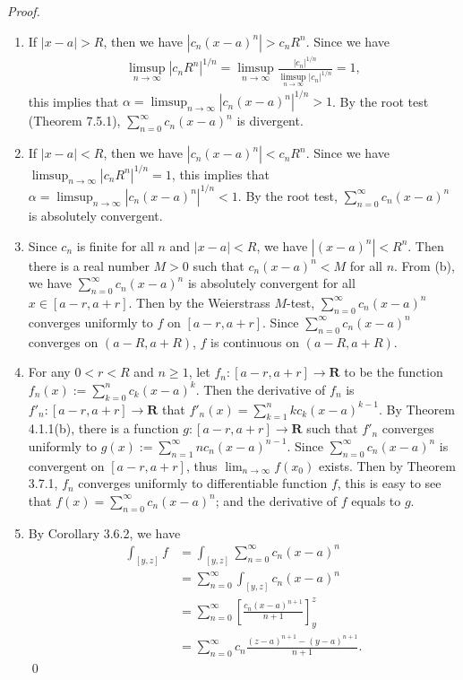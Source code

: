 \documentclass{book}
\newcommand{\pff}{\vspace{.25em}\noindent\emph{Proof.}~~}
\begin{document}
\pff
\begin{enumerate}
    \item If $|x - a| > R$, then we have $|c_n(x - a)^n| > c_nR^n$. Since we have
        \begin{align*}
            \limsup_{n \to \infty} |c_nR^n|^{1/n}
            = \limsup_{n \to \infty} \frac{|c_n|^{1/n}}{\limsup_{n \to \infty} |c_n|^{1/n}} = 1,
        \end{align*}
    this implies that $\alpha = \limsup_{n \to \infty} |c_n(x - a)^n|^{1/n} > 1$. By the root test (Theorem 7.5.1), $\sum_{n = 0}^{\infty} c_n(x - a)^n$ is divergent.

    \item If $|x - a| < R$, then we have $|c_n(x - a)^n| < c_nR^n$. Since we have $\limsup_{n \to \infty} |c_nR^n|^{1/n} = 1$, this implies that $\alpha = \limsup_{n \to \infty} |c_n(x - a)^n|^{1/n} < 1$. By the root test, $\sum_{n = 0}^{\infty} c_n(x - a)^n$ is absolutely convergent.

    \item Since $c_n$ is finite for all $n$ and $|x - a| < R$, we have $|(x - a)^n| < R^n$. Then there is a real number $M > 0$ such that $c_n(x - a)^n < M$ for all $n$. From (b), we have $\sum_{n = 0}^{\infty} c_n(x - a)^n$ is absolutely convergent for all $x \in [a - r, a + r]$. Then by the Weierstrass $M$-test, $\sum_{n = 0}^{\infty} c_n(x - a)^n$ converges uniformly to $f$ on $[a - r, a + r]$. Since $\sum_{n = 0}^{\infty} c_n(x - a)^n$ converges on $(a - R, a + R)$, $f$ is continuous on $(a - R, a + R)$.

    \item For any $0 < r < R$ and $n \geq 1$, let $f_n : [a - r, a + r] \to \mathbf{R}$ to be the function $f_n(x) := \sum_{k = 0}^{n} c_k(x - a)^k$. Then the derivative of $f_n$ is $f'_n : [a - r, a + r] \to \mathbf{R}$ that $f'_n(x) = \sum_{k = 1}^{n} kc_k(x - a)^{k - 1}$. By Theorem 4.1.1(b), there is a function $g : [a - r, a + r] \to \mathbf{R}$ such that $f'_n$ converges uniformly to $g(x) := \sum_{n = 1}^{\infty} nc_n(x - a)^{n - 1}$. Since $\sum_{n = 0}^{\infty} c_n(x - a)^n$ is convergent on $[a - r, a + r]$, thus $\lim_{n \to \infty} f(x_0)$ exists. Then by Theorem 3.7.1, $f_n$ converges uniformly to differentiable function $f$, this is easy to see that $f(x) = \sum_{n = 0}^{\infty} c_n(x - a)^n$; and the derivative of $f$ equals to $g$.

    \item By Corollary 3.6.2, we have
        \begin{align*}
            \int_{[y, z]} f
            &= \int_{[y, z]} \sum_{n = 0}^{\infty} c_n(x - a)^{n}\\
            &= \sum_{n = 0}^{\infty} \int_{[y, z]} c_n(x - a)^{n}\\
            &= \sum_{n = 0}^{\infty} \left[\frac{c_n(x - a)^{n + 1}}{n + 1}\right]_{y}^{z}\\
            &= \sum_{n = 0}^{\infty} c_n\frac{(z - a)^{n + 1} - (y - a)^{n + 1}}{n + 1}.
        \end{align*}\qed
\end{enumerate}
\newpage
\end{document}
